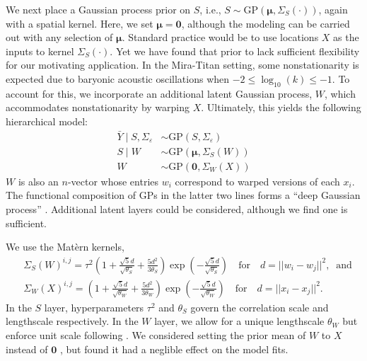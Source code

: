 \documentclass[11pt]{article}
\begin{document}
We next place a Gaussian process prior on $S$, i.e.,
$S\sim \mathrm{GP}\left(\boldsymbol{\mu}, \Sigma_S(\cdot)\right)$, again with a 
spatial kernel. Here, we set $\boldsymbol{\mu}=\mathbf{0}$, although the modeling can 
be carried out with any selection of $\boldsymbol{\mu}$. Standard practice would 
be to use locations $X$ as the inputs to kernel $\Sigma_S(\cdot)$.
Yet we have found that prior to lack sufficient flexibility for our motivating
application.  In the Mira-Titan setting, some nonstationarity is expected due to 
baryonic acoustic oscillations when $-2 \leq \log_{10}(k) \leq -1$. To account 
for this, we incorporate an additional latent Gaussian process, $W$, which accommodates
nonstationarity by warping $X$.  Ultimately, this yields the following hierarchical model:
\begin{equation}\label{eq:dgphm}
\begin{aligned}
\bar{Y}\mid S,\Sigma_\varepsilon &\sim \mathrm{GP}(S,\Sigma_\varepsilon) \\
S\mid W &\sim \mathrm{GP}\left(\boldsymbol{\mu}, \Sigma_S(W)\right) \\
W &\sim \mathrm{GP}\left(\mathbf{0}, \Sigma_W(X)\right)
\end{aligned}
\end{equation}
$W$ is also an $n$-vector whose entries $w_i$ correspond to warped versions of each $x_i$.
The functional composition of GPs in the latter two lines forms a ``deep Gaussian process'' 
\citep{damianou2013deep,dunlop2018deep}. Additional latent layers could be considered, 
although we find one is sufficient.

We use the Mat\`ern kernels,
\[
\begin{aligned}
&\Sigma_S(W)^{i,j} = \tau^2 \left( 1 + \frac{\sqrt{5}d}{\sqrt{\theta_S}} + 
  \frac{5d^2}{3\theta_S}\right) \exp\left(-\frac{\sqrt{5}d}{\sqrt{\theta_S}}\right)
\quad\textrm{for}\quad 
d=||w_i-w_j||^2, \;\;\textrm{and} \\
&\Sigma_W(X)^{i,j} = \left( 1 + \frac{\sqrt{5}d}{\sqrt{\theta_W}} + 
  \frac{5d^2}{3\theta_W}\right) \exp\left(-\frac{\sqrt{5}d}{\sqrt{\theta_W}}\right)
\quad\textrm{for}\quad 
d=||x_i-x_j||^2.
\end{aligned}
\]
In the $S$ layer, hyperparameters $\tau^2$ and $\theta_S$ govern the 
correlation scale and lengthscale respectively.  In the $W$ layer, we allow for a
unique lengthscale $\theta_W$ but enforce unit scale following \citet{sauer2023active}.
We considered setting the prior mean of $W$ to $X$ instead of $\mathbf{0}$
\citep[which would indicate stationarity apriori;][]{schmidt2003bayesian}, but found
it had a neglible effect on the model fits.
\end{document}
